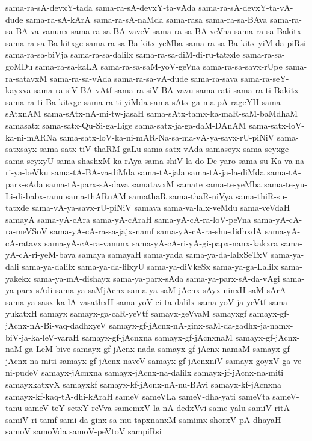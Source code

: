 {sama-ra-sA-devxY-tada
sama-ra-sA-devxY-ta-vAda
sama-ra-sA-devxY-ta-vA-dude
sama-ra-sA-kArA
sama-ra-sA-naMda
sama-rasa
sama-ra-sa-BAva
sama-ra-sa-BA-va-vanunx
sama-ra-sa-BA-vaveV
sama-ra-sa-BA-veVna
sama-ra-sa-Bakitx
sama-ra-sa-Ba-kitxge
sama-ra-sa-Ba-kitx-yeMba
sama-ra-sa-Ba-kitx-yiM-da-piRsi
sama-ra-sa-biVja
sama-ra-sa-dalilx
sama-ra-sa-diM-di-ru-tatxde
sama-ra-sa-goMDu
sama-ra-sa-kaLA
sama-ra-sa-saM-yoV-geVna
sama-ra-sa-savx-rUpe
sama-ra-satavxM
sama-ra-sa-vAda
sama-ra-sa-vA-dude
sama-ra-sava
sama-ra-seY-kayxva
sama-ra-siV-BA-vAtf
sama-ra-siV-BA-vavu
sama-rati
sama-ra-ti-Bakitx
sama-ra-ti-Ba-kitxge
sama-ra-ti-yiMda
sama-sAtx-ga-ma-pA-rageYH
sama-sAtxnAM
sama-sAtx-nA-mi-tw-jasaH
sama-sAtx-tamx-ka-maR-saM-baMdhaM
samasatx
sama-satx-Qu-Si-ga-Lige
sama-satx-ja-ga-daM-DAnAM
sama-satx-loV-ka-ni-mARNa
sama-satx-loV-ka-ni-mAR-Na-sa-ma-vA-ya-savx-rU-piNiV
sama-satxsayx
sama-satx-tiV-thaRM-gaLu
sama-satx-vAda
samaseyx
sama-seyxge
sama-seyxyU
sama-shashxM-ka-rAya
sama-shiV-la-do-De-yaro
sama-su-Ka-va-na-ri-ya-beVku
sama-tA-BA-va-diMda
sama-tA-jala
sama-tA-ja-la-diMda
sama-tA-parx-sAda
sama-tA-parx-sA-dava
samatavxM
samate
sama-te-yeMba
sama-te-yu-Li-di-babx-ranu
sama-thARnAM
samathaR
sama-thaR-niVya
sama-thiR-su-tatxde
sama-vA-ya-savx-rU-piNiV
samava
sama-va-lalx-veMdu
sama-veVdaH
samayA
sama-yA-cAra
sama-yA-cAraH
sama-yA-cA-ra-loV-peVna
sama-yA-cA-ra-meVSoV
sama-yA-cA-ra-sa-jajx-namf
sama-yA-cA-ra-shu-didhxdA
sama-yA-cA-ratavx
sama-yA-cA-ra-vanunx
sama-yA-cA-ri-yA-gi-papx-nanx-kakxra
sama-yA-cA-ri-yeM-bava
samaya
samayaH
sama-yada
sama-ya-da-lalxSeTxV
sama-ya-dali
sama-ya-dalilx
sama-ya-da-lilxyU
sama-ya-diVkeSx
sama-ya-ga-Lalilx
sama-yakekx
sama-ya-mA-dishayx
sama-ya-parx-sAda
sama-ya-parx-sA-da-vAgi
sama-ya-parx-sAdi
sama-ya-saMjAcnx
sama-ya-saM-jAcnx-sAyx-ninxH-saM-sArA
sama-ya-sasx-ka-lA-vasathxH
sama-yoV-ci-ta-dalilx
sama-yoV-ja-yeVtf
sama-yukatxH
samayx
samayx-ga-caR-yeVtf
samayx-geVvaM
samayxgf
samayx-gf-jAcnx-nA-Bi-vaq-dadhxyeV
samayx-gf-jAcnx-nA-ginx-saM-da-gadhx-ja-namx-biV-ja-ka-leV-varaH
samayx-gf-jAcnxna
samayx-gf-jAcnxnaM
samayx-gf-jAcnx-naM-ga-LeM-bive
samayx-gf-jAcnx-nada
samayx-gf-jAcnx-namaM
samayx-gf-jAcnx-na-miti
samayx-gf-jAcnx-naveV
samayx-gf-jAcnxniV
samayx-goyxV-ga-ve-ni-pudeV
samayx-jAcnxna
samayx-jAcnx-na-dalilx
samayx-jf-jAcnx-na-miti
samayxkatxvX
samayxkf
samayx-kf-jAcnx-nA-nu-BAvi
samayx-kf-jAcnxna
samayx-kf-kaq-tA-dhi-kAraH
sameV
sameVLa
sameV-dha-yati
sameVta
sameV-tanu
sameV-teY-setxY-reVva
samemxV-la-nA-dedxVvi
same-yalu
samiV-ritA
samiV-ri-tamf
sami-da-ginx-sa-mu-tapxnanxM
samimx-shorxV-pA-dhayaH
samoV
samoVda
samoV-peVtoV
sampiRsi
}
